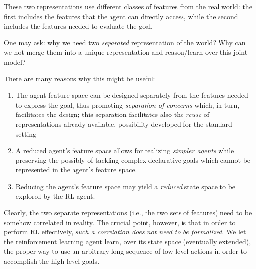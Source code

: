 These two representations use different classes of features
from the real world: the first includes the features that the agent can directly access, while the second includes the features needed to evaluate the \LLf goal.

One may ask: why we need two \emph{separated} representation of the world? Why can we not merge them into a unique representation and reason/learn over this joint model?

There are many reasons why this might be useful:
\begin{enumerate}
	\item The agent feature space can be designed separately from
	the features needed to express the goal, thus promoting
	\emph{separation of concerns} which, in turn, facilitates the design; this separation facilitates also the \emph{reuse} of representations already available, possibility developed for the standard setting.\label{motivation:separation-of-concern}
	
	\item A reduced agent's feature space allows for realizing \emph{simpler agents} while preserving the possibly of tackling complex declarative goals which cannot be represented in the agent's feature space. \label{motivation:simpler-agent}
	
	\item Reducing the agent's feature space may yield a \emph{reduced} state space to be explored by the RL-agent.\label{motivation:reduced-space}
	
\end{enumerate}

Clearly, the two separate representations (i.e., the two sets
of features) need to be somehow correlated in reality. The crucial point, however, is that in order to perform RL effectively, \emph{such a correlation does not need to be formalized}. We let the reinforcement learning agent learn, over its state space (eventually extended), the proper way to use an arbitrary long sequence of low-level actions in order to accomplish the high-level goals.

